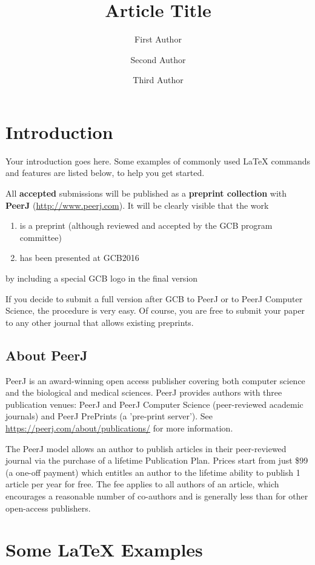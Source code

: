 \documentclass[fleqn,10pt,twoside]{gcb15submission}
\title{Article Title}
\author[1]{First Author}
\author[2]{Second Author}
\author[3]{Third Author}
\affil[1]{Affiliation of first author}
\affil[2]{Affiliation of second author}
\affil[3]{Affiliation of third author}
\begin{document}
\flushbottom
\maketitle
\thispagestyle{empty}


\section*{Introduction}

Your introduction goes here.
Some examples of commonly used {\LaTeX} commands and features are listed below, to help you get started.

All \textbf{accepted} submissions will be published as a \textbf{preprint collection} with \textbf{PeerJ} (\url{http://www.peerj.com}).
It will be clearly visible that the work
\begin{enumerate}
\item is a preprint (although reviewed and accepted by the GCB program committee)
\item has been presented at GCB2016
\end{enumerate}
by including a special GCB logo in the final version

If you decide to submit a full version after GCB to PeerJ or to PeerJ Computer Science, the procedure is very easy.
Of course, you are free to submit your paper to any other journal that allows existing preprints.


\subsection*{About PeerJ}

PeerJ is an award-winning open access publisher covering both computer science and the biological and medical sciences. 
PeerJ provides authors with three publication venues: PeerJ and PeerJ Computer Science (peer-reviewed academic journals) and PeerJ PrePrints (a 'pre-print server'). See \url{https://peerj.com/about/publications/} for more information.

The PeerJ model allows an author to publish articles in their peer-reviewed journal via the purchase of a lifetime Publication Plan. Prices start from just \$99 (a one-off payment) which entitles an author to the lifetime ability to publish 1 article per year for free.
The fee applies to all authors of an article, which encourages a reasonable number of co-authors and is generally less than for other open-access publishers.


\section*{Some \LaTeX{} Examples}
\label{sec:examples}
\end{document}
